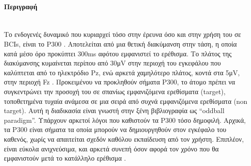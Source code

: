 \documentclass[11pt,a4paper,english,greek,twoside]{../Thesis}
\begin{document}
      \paragraph{Περιγραφή} ~\\
      Το ενδογενές δυναμικό που κυριαρχεί τόσο στην έρευνα όσο και στην χρήση του σε BCIs, είναι το P300 \cite{Gordeev2007-pu}. Αποτελείται από μια θετική διακύμανση στην τάση, η οποία κατά μέσο όρο προκύπτει 300ms αφότου εμφανιστεί το ερέθισμα. Το πλάτος της διακύμανσης κυμαίνεται περίπου από 30μV στην περιοχή του εγκεφάλου που καλύπτεται από το ηλεκτρόδιο Pz, ενώ αρκετά χαμηλότερο πλάτος, κοντά στα 5μV, στην περιοχή Fz \cite{Perlman2013-sg}. Προκειμένου να προκληθούν σήματα P300, το άτομο πρέπει να συγκεντρώνει την προσοχή του σε σπανίως εμφανιζόμενα ερεθίσματα (target), τοποθετημένα τυχαία ανάμεσα σε μια σειρά από συχνά εμφανιζόμενα ερεθίσματα (non target). Αυτή η διαδικασία είναι γνωστή στην ξένη βιβλιογραφία ως “oddball paradigm”. Υπάρχουν αρκετοί λόγοι που καθιστούν τα P300 τόσο δημοφιλή. Αρχικά, τα P300 είναι σήματα τα οποία μπορούν να δημιουργηθούν στον εγκέφαλο του καθενός, χωρίς να απαιτείται σχεδόν καθόλου εκπαίδευση από τον χρήστη. Επιπλέον, είναι εύκολα ανιχνεύσιμα, και αρκετά συνεπή όσον αφορά τον χρόνο που θα εμφανιστούν μετά το κατάλληλο ερέθισμα \cite{Fazel-Rezai2012-mk}. 
      
\end{document}

